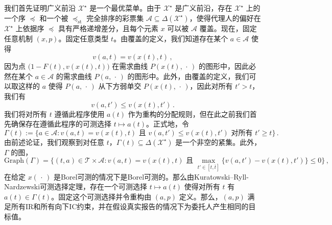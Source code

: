 \documentclass[12pt,letterpaper]{article}
\newenvironment{translation}{\color{blue}\noindent}{}
\theoremstyle{plain}
\theoremstyle{definition}
\theoremstyle{remark}
\renewcommand{\1}{\mathds{1}}
\newcommand{\X}{\mathcal{X}}
\theoremstyle{definition}
\begin{document}
\begin{translation}
我们首先证明广义前沿 $\X^\star$ 是一个最优菜单。由于 $\X^\star$ 是广义前沿，存在 $\X^\star$ 上的一个序 $\preceq$ 和一个被 $\preceq_{\text{st}}$ 完全排序的彩票集 $\mathcal{A} \subseteq \Delta(\X^\star)$，使得代理人的偏好在 $\X^\star$ 上依据序 $\preceq$ 具有严格递增差分，且每个元素 $x$ 可以被 $\mathcal{A}$ 覆盖。现在，固定任意机制 $(x, p)$。固定任意类型 $t$。由覆盖的定义，我们知道存在某个 $a \in \mathcal{A}$ 使得
\[v(a, t) = v(x(t), t)\,,\]
因为点 $\big(1 - F(t), v(x(t), t)\big)$ 在需求曲线 $P(x(t), \,\cdot\,)$ 的图形中，因此必然在某个 $a \in \mathcal{A}$ 的需求曲线 $P(a, \,\cdot\,)$ 的图形中。此外，由覆盖的定义，我们可以取这样的 $a$ 使得 $P(a, \,\cdot\,)$ 从下方弱单交 $P(x(t), \,\cdot\,)$，因此对所有 $t' > t$，我们有
\[v(a, t') \leq v(x(t), t')\,.\]
我们将对所有 $t$ 遵循此程序使用 $a(t)$ 作为重构的分配规则，但在此之前我们首先确保存在遵循此程序的可测选择 $t \mapsto a(t)$。正式地，令
\[\Gamma(t):= \Big\{a \in \mathcal{A}: v(a, t) = v(x(t), t) \text{ 且 } v(a, t') \leq v(x(t), t') \text{ 对所有 $t' \geq t$} \Big\}\,.\]
由前述论证，我们观察到对任意 $t$，$\Gamma(t) \subseteq \Delta(\X^\star)$ 是一个非空的紧集。此外，$\Gamma$ 的图，
\[\text{Graph}(\Gamma) = \Big\{(t, a) \in \mathcal{T} \times \mathcal{A}: v(a, t) = v(x(t), t) \text{ 且 } \max_{t' \in [t, \overline{t}]} \big\{v(a, t') - v(x(t), t')\big\} \leq 0  \Big\}\,,\]
在给定 $x(\,\cdot\,)$ 是Borel可测的情况下是Borel可测的。那么由Kuratowski--Ryll-Nardzewski可测选择定理，存在一个可测选择 $t \mapsto a(t)$ 使得对所有 $t$ 有 $a(t) \in \Gamma(t)$。固定这个可测选择并令重构由 $(a, p)$ 定义。那么，$(a, p)$ 满足所有IR和所有向下IC约束，并在假设真实报告的情况下为委托人产生相同的目标值。
\end{translation}
\end{document}

